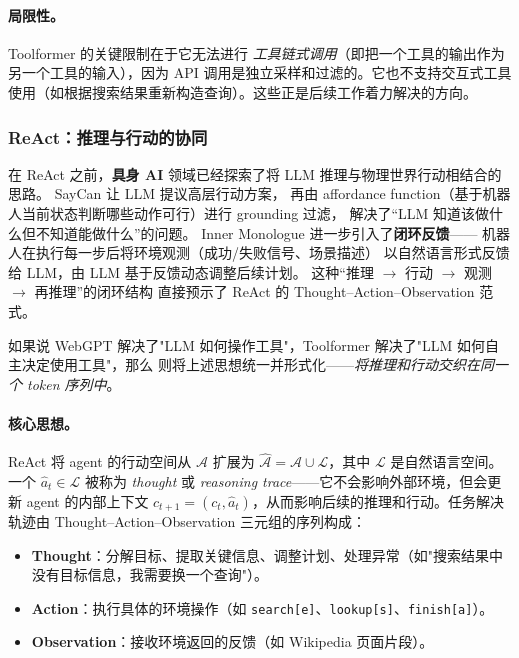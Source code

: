 \paragraph{局限性。} Toolformer 的关键限制在于它无法进行 \emph{工具链式调用}（即把一个工具的输出作为另一个工具的输入），因为 API 调用是独立采样和过滤的。它也不支持交互式工具使用（如根据搜索结果重新构造查询）。这些正是后续工作着力解决的方向。

\subsubsection{ReAct：推理与行动的协同}

在 ReAct 之前，\textbf{具身 AI} 领域已经探索了将 LLM 推理与物理世界行动相结合的思路。
SayCan \cite{ahn2022saycan} 让 LLM 提议高层行动方案，
再由 affordance function（基于机器人当前状态判断哪些动作可行）进行 grounding 过滤，
解决了``LLM 知道该做什么但不知道能做什么''的问题。
Inner Monologue \cite{huang2022innermonologue} 进一步引入了\textbf{闭环反馈}——
机器人在执行每一步后将环境观测（成功/失败信号、场景描述）
以自然语言形式反馈给 LLM，由 LLM 基于反馈动态调整后续计划。
这种``推理 $\rightarrow$ 行动 $\rightarrow$ 观测 $\rightarrow$ 再推理''的闭环结构
直接预示了 ReAct 的 Thought--Action--Observation 范式。

如果说 WebGPT 解决了"LLM 如何操作工具"，Toolformer 解决了"LLM 如何自主决定使用工具"，那么  则将上述思想统一并形式化——\emph{将推理和行动交织在同一个 token 序列中}。

\paragraph{核心思想。} ReAct 将 agent 的行动空间从 $\mathcal{A}$ 扩展为 $\hat{\mathcal{A}} = \mathcal{A} \cup \mathcal{L}$，其中 $\mathcal{L}$ 是自然语言空间。一个 $\hat{a}_t \in \mathcal{L}$ 被称为 \emph{thought} 或 \emph{reasoning trace}——它不会影响外部环境，但会更新 agent 的内部上下文 $c_{t+1} = (c_t, \hat{a}_t)$，从而影响后续的推理和行动。任务解决轨迹由 Thought--Action--Observation 三元组的序列构成：
\begin{itemize}[leftmargin=*]
  \item \textbf{Thought}：分解目标、提取关键信息、调整计划、处理异常（如"搜索结果中没有目标信息，我需要换一个查询"）。
  \item \textbf{Action}：执行具体的环境操作（如 \texttt{search[e]}、\texttt{lookup[s]}、\texttt{finish[a]}）。
  \item \textbf{Observation}：接收环境返回的反馈（如 Wikipedia 页面片段）。
\end{itemize}

